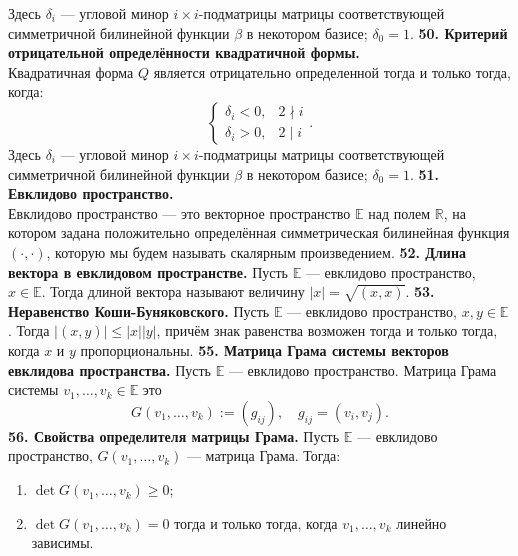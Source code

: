 \documentclass{article}
\begin{document}
Здесь $\delta_i$ --- угловой минор $i\times i$-подматрицы матрицы соответствующей симметричной билинейной функции $\beta$ в некотором базисе; $\delta_0 = 1$.
\newline
\newline
\textbf{50. Критерий отрицательной определённости квадратичной формы.}\\
Квадратичная форма $Q$ является отрицательно определенной тогда и только тогда,\\ когда:
$$
\begin{cases}
	\delta_i < 0, & 2 \nmid i \\
	\delta_i > 0, & 2 \mid i
\end{cases}.
$$
Здесь $\delta_i$ --- угловой минор $i\times i$-подматрицы матрицы соответствующей симметричной билинейной функции $\beta$ в некотором базисе; $\delta_0 = 1$.
\newline
\newline
\textbf{51. Евклидово пространство.}\\
Евклидово пространство --- это векторное пространство $\mathbb{E}$ над полем $\mathbb{R}$, на котором задана положительно определённая симметрическая билинейная функция $(\cdot, \cdot)$, которую мы будем называть скалярным произведением.
\newline
\newline
\textbf{52. Длина вектора в евклидовом пространстве.}
Пусть $\mathbb{E}$ --- евклидово пространство, $x\in \mathbb{E}$. Тогда длиной вектора называют величину $|x| = \sqrt{(x,x)}$.
\newline
\newline
\textbf{53. Неравенство Коши-Буняковского.}
Пусть $\mathbb{E}$ --- евклидово пространство, $x, y \in \mathbb{E}$. Тогда $|(x,y)| \leqslant |x||y|$, причём знак равенства возможен тогда и только тогда, когда $x$ и $y$ пропорциональны.
\newline
\newline
\textbf{55. Матрица Грама системы векторов евклидова пространства.}
Пусть $\mathbb{E}$ --- евклидово пространство.
Матрица Грама системы $v_1, \ldots, v_k \in \mathbb{E}$ это
	$$G(v_1,\ldots, v_k) := (g_{ij}),\quad g_{ij} = (v_i,v_j).$$
\newline
\newline
\textbf{56. Свойства определителя матрицы Грама.}
Пусть $\mathbb{E}$ --- евклидово пространство, $G(v_1,\ldots, v_k)$ --- матрица Грама. Тогда:
\begin{enumerate}
	\item $\det G(v_1, \ldots, v_k) \geqslant 0$;
	\item $\det G(v_1, \ldots, v_k) = 0$ тогда и только тогда, когда $v_1, \ldots, v_k$ линейно зависимы.
\end{enumerate}
\end{document}
